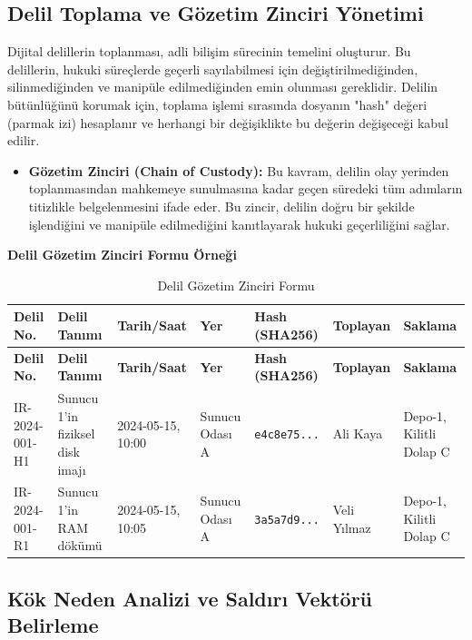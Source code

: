 \begin{itemize}
\begin{itemize}
\subsection{Delil Toplama ve Gözetim Zinciri Yönetimi}

Dijital delillerin toplanması, adli bilişim sürecinin temelini oluşturur. Bu delillerin, hukuki süreçlerde geçerli sayılabilmesi için değiştirilmediğinden, silinmediğinden ve manipüle edilmediğinden emin olunması gereklidir. Delilin bütünlüğünü korumak için, toplama işlemi sırasında dosyanın "hash" değeri (parmak izi) hesaplanır ve herhangi bir değişiklikte bu değerin değişeceği kabul edilir.

\begin{itemize}
    \item \textbf{Gözetim Zinciri (Chain of Custody):} Bu kavram, delilin olay yerinden toplanmasından mahkemeye sunulmasına kadar geçen süredeki tüm adımların titizlikle belgelenmesini ifade eder. Bu zincir, delilin doğru bir şekilde işlendiğini ve manipüle edilmediğini kanıtlayarak hukuki geçerliliğini sağlar.
\end{itemize}

\textbf{Delil Gözetim Zinciri Formu Örneği}

\begin{longtable}{|>{\tiny}p{0.7cm}|>{\tiny}p{1cm}|>{\tiny}p{0.7cm}|>{\tiny}p{0.7cm}|>{\tiny}p{0.7cm}|>{\tiny}p{0.7cm}|>{\tiny}p{1cm}|}
\caption{Delil Gözetim Zinciri Formu}\\
\hline
\textbf{Delil No.} & \textbf{Delil Tanımı} & \textbf{Tarih/Saat} & \textbf{Yer} & \textbf{Hash (SHA256)} & \textbf{Toplayan} & \textbf{Saklama} \\
\hline
\endfirsthead
\hline
\textbf{Delil No.} & \textbf{Delil Tanımı} & \textbf{Tarih/Saat} & \textbf{Yer} & \textbf{Hash (SHA256)} & \textbf{Toplayan} & \textbf{Saklama} \\
\hline
\endhead
IR-2024-001-H1 & Sunucu 1'in fiziksel disk imajı & 2024-05-15, 10:00 & Sunucu Odası A & \texttt{e4c8e75...} & Ali Kaya & Depo-1, Kilitli Dolap C \\
\hline
IR-2024-001-R1 & Sunucu 1'in RAM dökümü & 2024-05-15, 10:05 & Sunucu Odası A & \texttt{3a5a7d9...} & Veli Yılmaz & Depo-1, Kilitli Dolap C \\
\hline
\end{longtable}
\end{itemize}

\subsection{Kök Neden Analizi ve Saldırı Vektörü Belirleme}


\end{itemize}
